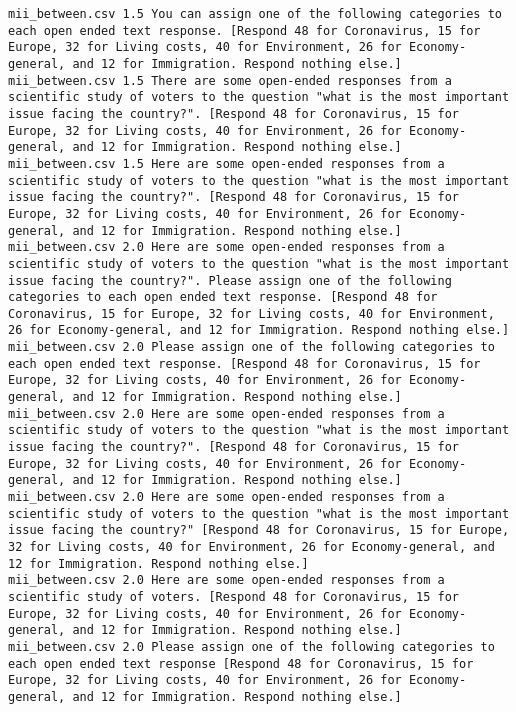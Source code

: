 \begin{lstlisting}[label=lst:promptvariants]
mii_between.csv	1.5	You can assign one of the following categories to each open ended text response. [Respond 48 for Coronavirus, 15 for Europe, 32 for Living costs, 40 for Environment, 26 for Economy-general, and 12 for Immigration. Respond nothing else.]
mii_between.csv	1.5	There are some open-ended responses from a scientific study of voters to the question "what is the most important issue facing the country?". [Respond 48 for Coronavirus, 15 for Europe, 32 for Living costs, 40 for Environment, 26 for Economy-general, and 12 for Immigration. Respond nothing else.]
mii_between.csv	1.5	Here are some open-ended responses from a scientific study of voters to the question "what is the most important issue facing the country?". [Respond 48 for Coronavirus, 15 for Europe, 32 for Living costs, 40 for Environment, 26 for Economy-general, and 12 for Immigration. Respond nothing else.]
mii_between.csv	2.0	Here are some open-ended responses from a scientific study of voters to the question "what is the most important issue facing the country?". Please assign one of the following categories to each open ended text response. [Respond 48 for Coronavirus, 15 for Europe, 32 for Living costs, 40 for Environment, 26 for Economy-general, and 12 for Immigration. Respond nothing else.]
mii_between.csv	2.0	Please assign one of the following categories to each open ended text response. [Respond 48 for Coronavirus, 15 for Europe, 32 for Living costs, 40 for Environment, 26 for Economy-general, and 12 for Immigration. Respond nothing else.]
mii_between.csv	2.0	Here are some open-ended responses from a scientific study of voters to the question "what is the most important issue facing the country?". [Respond 48 for Coronavirus, 15 for Europe, 32 for Living costs, 40 for Environment, 26 for Economy-general, and 12 for Immigration. Respond nothing else.]
mii_between.csv	2.0	Here are some open-ended responses from a scientific study of voters to the question "what is the most important issue facing the country?" [Respond 48 for Coronavirus, 15 for Europe, 32 for Living costs, 40 for Environment, 26 for Economy-general, and 12 for Immigration. Respond nothing else.]
mii_between.csv	2.0	Here are some open-ended responses from a scientific study of voters. [Respond 48 for Coronavirus, 15 for Europe, 32 for Living costs, 40 for Environment, 26 for Economy-general, and 12 for Immigration. Respond nothing else.]
mii_between.csv	2.0	Please assign one of the following categories to each open ended text response [Respond 48 for Coronavirus, 15 for Europe, 32 for Living costs, 40 for Environment, 26 for Economy-general, and 12 for Immigration. Respond nothing else.]

\end{lstlisting}
